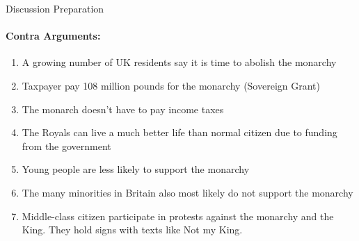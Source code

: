 \documentclass[12pt,a4paper]{report}
\begin{document}
	\noindent
	\Large
	Discussion Preparation
	\large
	\paragraph{Contra Arguments:}
	\begin{enumerate}
		\item A growing number of UK residents say it is time to abolish the monarchy
		\item Taxpayer pay 108 million pounds for the monarchy (\dq Sovereign Grant\dq)
		\item The monarch doesn't have to pay income taxes
		\item The Royals can live a much better life than normal citizen due to funding from the government
		\item Young people are less likely to support the monarchy
		\item The many minorities in Britain also most likely do not support the monarchy 
		\item Middle-class citizen participate in protests against the monarchy and the King. They hold signs with texts like \dq Not my King\dq.
	\end{enumerate}
\end{document}
